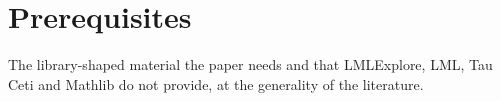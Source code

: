 \chapter{Prerequisites}
\label{chap:prerequisites}

The library-shaped material the paper needs and that LMLExplore, LML, Tau Ceti and Mathlib do not
provide, at the generality of the literature.
